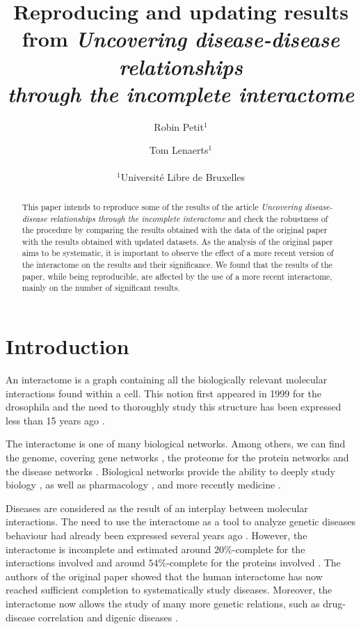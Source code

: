 \documentclass[letterpaper]{article}
\title{Reproducing and updating results from
\textit{Uncovering disease-disease relationships\\through the incomplete interactome}}
\author{Robin Petit$^{1}$ \and Tom Lenaerts$^{1}$\\
\mbox{}\\
$^1$Université Libre de Bruxelles}
\begin{document}
\maketitle

\begin{abstract}
This paper intends to reproduce some of the results of the article \textit{Uncovering
disease-disease relationships through the incomplete interactome} \citep{originalPaper}
and check the robustness of the procedure by comparing the results obtained with the data
of the original paper with the results obtained with updated datasets. As the analysis of
the original paper aims to be systematic, it is important to observe the effect of a
more recent version of the interactome on the results and their significance. We found that
the results of the paper, while being reproducible, are affected by the use of a more recent
interactome, mainly on the number of significant results.
\end{abstract}

\section{Introduction}
An interactome is a graph containing all the biologically relevant molecular interactions found within
a cell. This notion first appeared in 1999 for the drosophila \citep{sanchez1999grasping} and the need
to thoroughly study this structure has been expressed less than 15 years ago
\citep{UnderstandingTheCellFunctionalOrganization}.

The interactome is one of many biological networks. Among others, we can find the genome, covering
gene networks \citep{boucher2013genetic}, the proteome for the protein networks
\citep{rolland2014proteome} and the disease networks \citep{goh2007human}. Biological networks provide
the ability to deeply study biology \citep{UnderstandingTheCellFunctionalOrganization}, as well as
pharmacology \citep{hopkins2008network}, and more recently medicine \citep{barabasi2011network}.

Diseases are considered as the result of an interplay between molecular interactions. The need to use
the interactome as a tool to analyze genetic diseases behaviour had already been expressed several years
ago \citep{vidal2011interactome}. However, the interactome is incomplete and estimated around $20\%$-complete
for the interactions involved and around $54\%$-complete for the proteins involved
\citep{ATruerMeasureOfOurIgnorance,estimatingTheSizeOfTheHumanInteractome}. The authors of the original paper
\citep{originalPaper} showed that the human interactome has now reached sufficient completion to systematically
study diseases. Moreover, the interactome now allows the study of many more genetic relations, such as
drug-disease correlation \citep{Yu2016extraction} and digenic diseases \citep{gazzo2015dida}.
\end{document}
